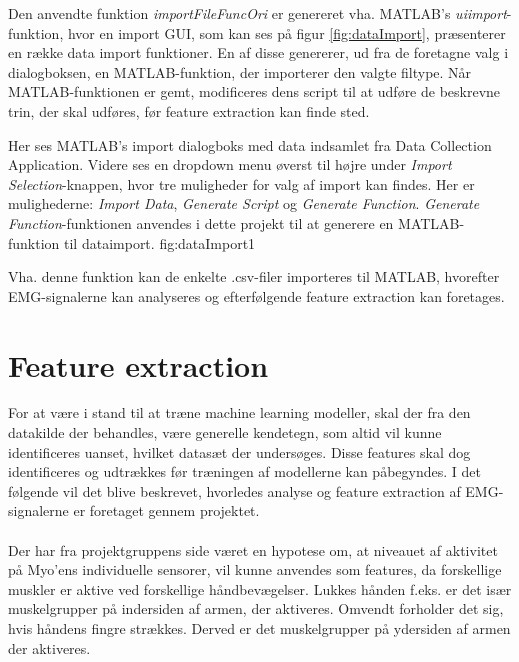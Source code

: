 Den anvendte funktion \textit{importFileFuncOri} er genereret vha. MATLAB's \textit{uiimport}-funktion\citep{matlabUiimport}, hvor en import GUI, som kan ses på figur \ref{fig:dataImport}, præsenterer en række data import funktioner. En af disse genererer, ud fra de foretagne valg i dialogboksen, en MATLAB-funktion, der importerer den valgte filtype. Når MATLAB-funktionen er gemt, modificeres dens script til at udføre de beskrevne trin, der skal udføres, før feature extraction kan finde sted.

{
	Her ses MATLAB's import dialogboks med data indsamlet fra Data Collection Application. Videre ses en dropdown menu øverst til højre under \textit{Import Selection}-knappen, hvor tre muligheder for valg af import kan findes. Her er mulighederne: \textit{Import Data}, \textit{Generate Script} og \textit{Generate Function}. \textit{Generate Function}-funktionen anvendes i dette projekt til at generere en MATLAB-funktion til dataimport.
 }{fig:dataImport}{1}

Vha. denne funktion kan de enkelte .csv-filer importeres til MATLAB, hvorefter EMG-signalerne kan analyseres og efterfølgende feature extraction kan foretages.

\section{Feature extraction}

For at være i stand til at træne machine learning modeller, skal der fra den datakilde der behandles, være generelle kendetegn, som altid vil kunne identificeres uanset, hvilket datasæt der undersøges. Disse features skal dog identificeres og udtrækkes før træningen af modellerne kan påbegyndes. I det følgende vil det blive beskrevet, hvorledes analyse og feature extraction af EMG-signalerne er foretaget gennem projektet.
\\\\
Der har fra projektgruppens side været en hypotese om, at niveauet af aktivitet på Myo'ens individuelle sensorer, vil kunne anvendes som features, da forskellige muskler er aktive ved forskellige håndbevægelser. Lukkes hånden f.eks. er det især muskelgrupper på indersiden af armen, der aktiveres. Omvendt forholder det sig, hvis håndens fingre strækkes. Derved er det muskelgrupper på ydersiden af armen der aktiveres.


